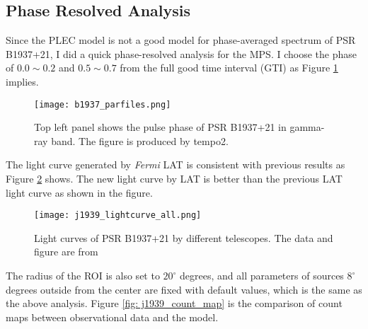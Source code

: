 \documentclass[a4paper, 12pt]{report}
\begin{document}
    \subsection{Phase Resolved Analysis}
      Since the PLEC model is not a good model for phase-averaged spectrum of 
      PSR B1937+21, I did a quick phase-resolved analysis for the MPS. I choose the 
      phase of $0.0 \sim 0.2$ and $0.5 \sim 0.7$ from the full good time interval (GTI) as 
      Figure \ref{fig: j1939_phase} implies. 
      \begin{figure}[!htp]
        \centering 
        \texttt{[image: b1937\_parfiles.png]}
        \caption{Top left panel shows the pulse phase of PSR B1937+21 in gamma-ray band. 
          The figure is produced by tempo2.}
        \label{fig: j1939_phase}
      \end{figure}

      The light curve generated by \textit{Fermi} LAT is consistent with previous results 
      \cite{J1939_old} as Figure \ref{fig: j1939_light_curve_compare} shows. 
      The new light curve by LAT is better than the previous LAT light curve
      as shown in the figure. 

      \begin{figure}
        \centering 
        \texttt{[image: j1939\_lightcurve\_all.png]}
        \caption{Light curves of PSR B1937+21 by different telescopes. The data and figure
          are from \cite{J1939_old}}
        \label{fig: j1939_light_curve_compare}
      \end{figure}


      The radius of the ROI is also set to $20^{\circ}$ degrees, and all parameters of 
      sources $8^{\circ}$ degrees outside from the center are fixed with default values, 
      which is the same as the above analysis. 
      Figure \ref{fig: j1939_count_map} is the comparison of count maps between 
      observational data and the model.
\end{document}
